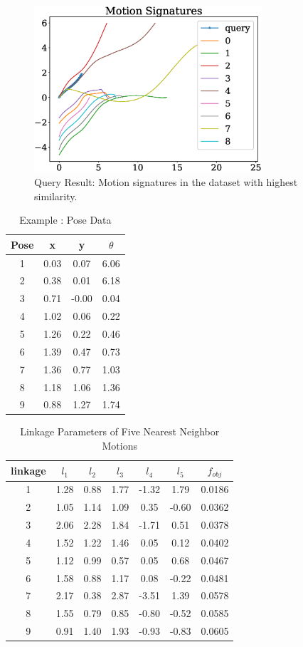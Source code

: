 \documentclass[twocolumn,10pt]{asme2e}
\begin{document}
\begin{figure}
\centering
\includegraphics[width=240pt]{figure/fig_ex_motion_signatures.eps}
  \caption{Query Result: Motion signatures in the dataset with highest similarity.}
\label{queryResult}
\end{figure}


\begin{table}
\caption{Example : Pose Data}
\centering
\label{poseData}
\begin{tabular}{cccc}
\hline
Pose & x & y & $\theta$ \\
\hline
1 & 0.03 & 0.07 & 6.06 \\
2 & 0.38 & 0.01 & 6.18 \\
3 & 0.71 &-0.00 & 0.04 \\
4 & 1.02 & 0.06 & 0.22 \\
5 & 1.26 & 0.22 & 0.46 \\
6 & 1.39 & 0.47 & 0.73 \\
7 & 1.36 & 0.77 & 1.03 \\
8 & 1.18 & 1.06 & 1.36 \\
9 & 0.88 & 1.27 & 1.74 \\
\end{tabular}
\end{table}

\begin{table}
\caption{Linkage Parameters of Five Nearest Neighbor Motions}
\centering
\label{knnLinkageData}
\begin{tabular}{ccccccc}
\hline
  linkage & $l_1$ & $l_2$ & $l_3$ & $l_4$ & $l_5$ & $f_{obj}$ \\
\hline
 1 & 1.28 & 0.88 & 1.77 & -1.32 & 1.79 & 0.0186   \\
 2 & 1.05 & 1.14 & 1.09 & 0.35 & -0.60 & 0.0362   \\
 3 & 2.06 & 2.28 & 1.84 & -1.71 & 0.51 & 0.0378   \\
 4 & 1.52 & 1.22 & 1.46 & 0.05 & 0.12 & 0.0402    \\
 5 & 1.12 & 0.99 & 0.57 & 0.05 & 0.68 & 0.0467    \\
 6 & 1.58 & 0.88 & 1.17 & 0.08 & -0.22 & 0.0481   \\
 7 & 2.17 & 0.38 & 2.87 & -3.51 & 1.39 & 0.0578   \\
 8 & 1.55 & 0.79 & 0.85 & -0.80 & -0.52 & 0.0585  \\
 9 & 0.91 & 1.40 & 1.93 & -0.93 & -0.83 & 0.0605
\end{tabular}
\end{table}
\end{document}
